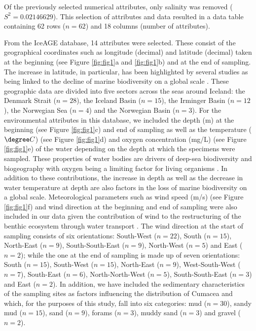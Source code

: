 Of the previously selected numerical attributes, only salinity was removed (\( S^2 = 0.02146629 \)). This selection of attributes and data resulted in a data table containing 62 rows (\( n=62 \)) and 18 columns (number of attributes). 

From the IceAGE database, 14 attributes were selected. These consist of the geographical coordinates such as longitude (decimal) and latitude (decimal) taken at the beginning (see Figure \ref{fig:fig1}a and \ref{fig:fig1}b) and at the end of sampling. The increase in latitude, in particular, has been highlighted by several studies as being linked to the decline of marine biodiversity on a global scale \citep{lambshead_latitudinal_2000, gage_diversity_2004}. These geographic data are divided into five sectors across the seas around Iceland: the Denmark Strait (\( n=28 \)), the Iceland Basin (\( n=15 \)), the Irminger Basin (\( n=12 \)), the Norwegian Sea (\( n=4 \)) and the Norwegian Basin (\( n=3 \)). For the environmental attributes in this database, we included the depth (m) at the beginning (see Figure \ref{fig:fig1}c) and end of sampling as well as the temperature (\( \degree C \)) (see Figure \ref{fig:fig1}d) and oxygen concentration (mg/L) (see Figure \ref{fig:fig1}e) of the water depending on the depth at which the specimens were sampled. These properties of water bodies are drivers of deep-sea biodiversity and biogeography with oxygen being a limiting factor for living organisms \citep{keeling_ocean_2010}. In addition to these contributions, the increase in depth \citep{rex_global_2006, costello_marine_2017} as well as the decrease in water temperature at depth \citep{lambshead_latitudinal_2000} are also factors in the loss of marine biodiversity on a global scale. Meteorological parameters such as wind speed (m/s) (see Figure \ref{fig:fig1}f) and wind direction at the beginning and end of sampling were also included in our data given the contribution of wind to the restructuring of the benthic ecosystem through water transport \citep{waga_recent_2020, saeedi_environmental_2022}. The wind direction at the start of sampling consists of six orientations: South-West (\( n=22 \)), South (\( n=15 \)), North-East (\( n=9 \)), South-South-East (\( n=9 \)), North-West (\( n=5 \)) and East (\( n=2 \)); while the one at the end of sampling is made up of seven orientations: South (\( n=15 \)), South-West (\( n=15 \)), North-East (\( n=9 \)), West-South-West (\( n=7 \)), South-East (\( n=6 \)), North-North-West (\( n=5 \)), South-South-East (\( n=3 \)) and East (\( n=2 \)). In addition, we have included the sedimentary characteristics of the sampling sites as factors influencing the distribution of Cumacea \citep{uhlir_adding_2021} and which, for the purposes of this study, fall into six categories: mud (\( n=30 \)), sandy mud (\( n=15 \)), sand (\( n=9 \)), forams (\( n=3 \)), muddy sand (\( n=3 \)) and gravel (\( n=2 \)).

